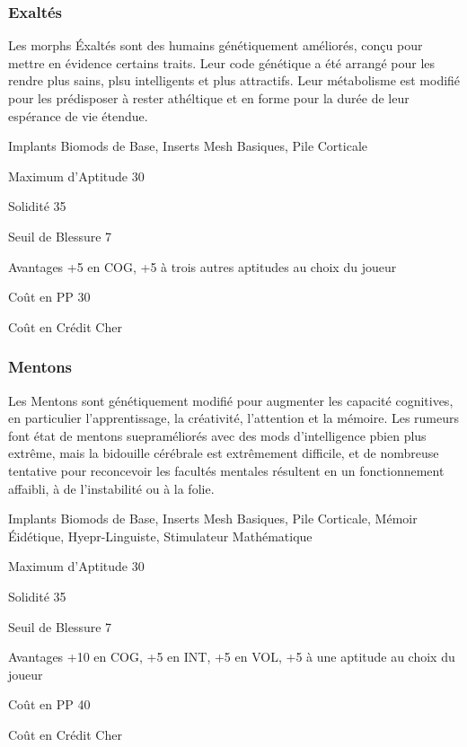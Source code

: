 \subsubsection{Exaltés} \label{sec:starting-exalts} 

Les morphs Éxaltés sont des humains génétiquement améliorés, conçu pour mettre en évidence certains traits. Leur code génétique a été arrangé pour les rendre plus sains, plsu intelligents et plus attractifs. Leur métabolisme est modifié pour les prédisposer à rester athéltique et en forme pour la durée de leur espérance de vie étendue. 

\begin{description*} \item[Implants] Biomods de Base, Inserts Mesh Basiques, Pile Corticale\item[Maximum d'Aptitude] 30 \item[Solidité] 35 \item[Seuil de Blessure] 7 \item[Avantages] +5 en COG, +5 à trois autres aptitudes au choix du joueur\item[Coût en PP] 30 \item[Coût en Crédit] Cher \end{description*} 

\subsubsection{Mentons} \label{sec:starting-mentons} 

Les Mentons sont génétiquement modifié pour augmenter les capacité cognitives, en particulier l'apprentissage, la créativité, l'attention et la mémoire. Les rumeurs font état de mentons suepraméliorés avec des mods d'intelligence pbien plus extrême, mais la bidouille cérébrale est extrêmement difficile, et de nombreuse tentative pour reconcevoir les facultés mentales résultent en un fonctionnement affaibli, à de l'instabilité ou à la folie. 

\begin{description*} \item[Implants] Biomods de Base, Inserts Mesh Basiques, Pile Corticale, Mémoir Éidétique, Hyepr-Linguiste, Stimulateur Mathématique\item[Maximum d'Aptitude] 30 \item[Solidité] 35 \item[Seuil de Blessure] 7 \item[Avantages] +10 en COG, +5 en INT, +5 en VOL, +5 à une aptitude au choix du joueur\item[Coût en PP] 40 \item[Coût en Crédit] Cher \end{description*} 

